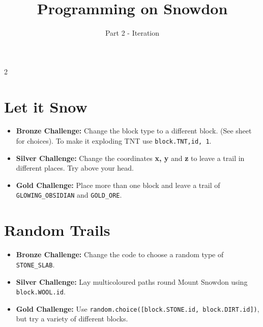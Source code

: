 \documentclass{geocraft-worksheet}
\begin{document}
\title{Programming on Snowdon}
\subtitle{Part 2 - Iteration}

\maketitle


\setcounter {section} {2}


\section{Let it Snow}
\lstset{language=Python}

\noindent%
%
\vspace{0.2cm}
%
%

\begin{itemize}
\item\textbf{Bronze Challenge:} Change the block type to a different
  block. (See sheet for choices). To make it exploding TNT use \lstinline{block.TNT,id, 1}. 
\item\textbf{Silver Challenge:} Change the coordinates \textbf{x, y}
    and \textbf{z} to leave a trail in different places. Try above your head. 
\item\textbf{Gold Challenge:} Place more than one block and leave a
  trail of \lstinline{GLOWING_OBSIDIAN} and \lstinline{GOLD_ORE}.
\end{itemize}

\section{Random Trails}

\noindent%
%
\vspace{0.2cm}
%
%

\begin{itemize}
\item\textbf{Bronze Challenge:} Change the code to choose a random
  type of \lstinline{STONE_SLAB}.
\item\textbf{Silver Challenge:} Lay multicoloured paths round Mount Snowdon using \lstinline{block.WOOL.id}.
\item\textbf{Gold Challenge:} Use
  \lstinline{random.choice([block.STONE.id, block.DIRT.id])}, but try
  a variety of different blocks.

\end{itemize}
\end{document}
